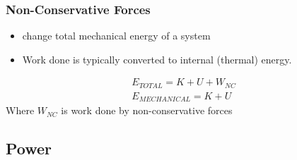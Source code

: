 \documentclass[../Notes.tex]{subfiles}
\begin{document}
\subsubsection{Non-Conservative Forces}
\begin{itemize}
    \item change total mechanical energy of a system 
    \item Work done is typically converted to internal (thermal) energy.
\end{itemize}
\begin{align*}
    E_{TOTAL} = K + U + W_{NC} \\ 
    E_{MECHANICAL} = K + U
\end{align*}
Where $W_{NC}$ is work done by non-conservative forces

\subsection{Power}
\end{document}
